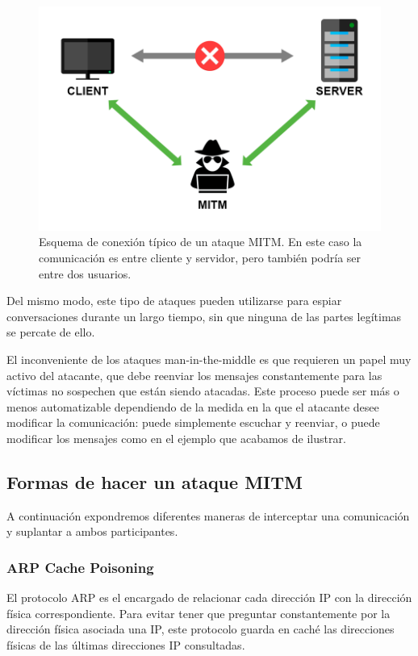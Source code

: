 \documentclass[11pt]{article}
\begin{document}
 \begin{figure}[H]
 	\centering
 	\includegraphics[width=120mm]{images/memoir/mitm}
 	\caption{Esquema de conexión típico de un ataque MITM. En este caso la comunicación es entre cliente y servidor, pero también podría
 		ser entre dos usuarios.}
 \end{figure}
 
 Del mismo modo, este tipo de ataques pueden utilizarse para espiar conversaciones durante un largo tiempo, sin que ninguna de las partes legítimas
 se percate de ello.
 
 El inconveniente de los ataques man-in-the-middle es que requieren un papel muy activo del atacante, que debe reenviar los mensajes constantemente
 para las víctimas no sospechen que están siendo atacadas. Este proceso puede ser más o menos automatizable dependiendo de la medida en la que el
 atacante desee modificar la comunicación: puede simplemente escuchar y reenviar, o puede modificar los mensajes como en el ejemplo que acabamos
 de ilustrar.
 
 \subsection{Formas de hacer un ataque MITM}
 
 A continuación expondremos diferentes maneras de interceptar una comunicación y suplantar a ambos participantes.
 
 \subsubsection*{ARP Cache Poisoning}
 
 El protocolo ARP es el encargado de relacionar cada dirección IP con la dirección física correspondiente. Para evitar tener que preguntar constantemente por la dirección física asociada una IP, este protocolo guarda en caché las direcciones físicas de las últimas direcciones IP consultadas.
 
\end{document}

